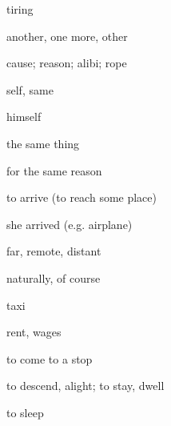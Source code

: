 \documentclass[avery5371,grid,frame]{flashcards}
\begin{document}
\begin{flashcard}{\LARGE tiring}
\LARGE {}
\end{flashcard}
\begin{flashcard}{\LARGE another, one more, other}
\LARGE {}
\end{flashcard}
\begin{flashcard}{\LARGE cause; reason; alibi; rope}
\LARGE {}
\end{flashcard}
\begin{flashcard}{\LARGE self, same}
\LARGE {}
\end{flashcard}
\begin{flashcard}{\LARGE himself}
\LARGE {}
\end{flashcard}
\begin{flashcard}{\LARGE the same thing}
\LARGE {}
\end{flashcard}
\begin{flashcard}{\LARGE for the same reason}
\LARGE {}
\end{flashcard}
\begin{flashcard}{\LARGE to arrive (to reach some place)}
\LARGE {}
\end{flashcard}
\begin{flashcard}{\LARGE she arrived (e.g. airplane)}
\LARGE {}
\end{flashcard}
\begin{flashcard}{\LARGE far, remote, distant}
\LARGE {}
\end{flashcard}
\begin{flashcard}{\LARGE naturally, of course}
\LARGE {}
\end{flashcard}
\begin{flashcard}{\LARGE taxi}
\LARGE {}
\end{flashcard}
\begin{flashcard}{\LARGE rent, wages}
\LARGE {}
\end{flashcard}
\begin{flashcard}{\LARGE to come to a stop}
\LARGE {}
\end{flashcard}
\begin{flashcard}{\LARGE to descend, alight; to stay, dwell}
\LARGE {}
\end{flashcard}
\begin{flashcard}{\LARGE to sleep}
\LARGE {}
\end{flashcard}
\end{document}
